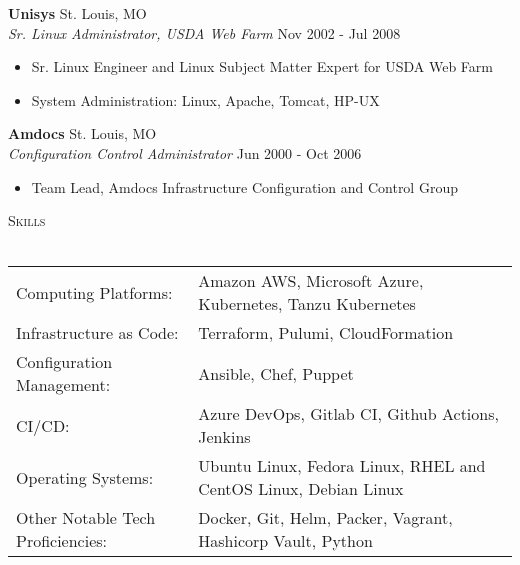\documentclass[letterpaper]{article}
\newcommand{\lineunder} {
    \vspace*{-8pt} \\
    \hspace*{-18pt} \hrulefill \\
}
\newcommand{\header} [1] {
    {\hspace*{-18pt}\vspace*{6pt} \textsc{#1}}
    \vspace*{-6pt} \lineunder
}
\begin{document}
\textbf{Unisys} \hfill St. Louis, MO\\
\textit{Sr. Linux Administrator, USDA Web Farm} \hfill Nov 2002 - Jul 2008\\
\vspace{-1mm}
\begin{itemize} \itemsep 1pt
	\item Sr. Linux Engineer and Linux Subject Matter Expert for USDA Web Farm
	\item System Administration: Linux, Apache, Tomcat, HP-UX
\end{itemize}
\textbf{Amdocs} \hfill St. Louis, MO\\
\textit{Configuration Control Administrator} \hfill Jun 2000 - Oct 2006\\
\vspace{-1mm}
\begin{itemize} \itemsep 1pt
	\item Team Lead, Amdocs Infrastructure Configuration and Control Group
\end{itemize}

\header{Skills}
\begin{tabular}{ l l }
	Computing Platforms:              & Amazon AWS, Microsoft Azure, Kubernetes, Tanzu Kubernetes       \\
	Infrastructure as Code:           & Terraform, Pulumi, CloudFormation                               \\
	Configuration Management:         & Ansible, Chef, Puppet                                           \\
	CI/CD:                            & Azure DevOps, Gitlab CI, Github Actions, Jenkins                \\
	Operating Systems:                & Ubuntu Linux, Fedora Linux, RHEL and CentOS Linux, Debian Linux \\
	Other Notable Tech Proficiencies: & Docker, Git, Helm, Packer, Vagrant, Hashicorp Vault, Python     \\
\end{tabular}
\vspace{2mm}
\end{document}
